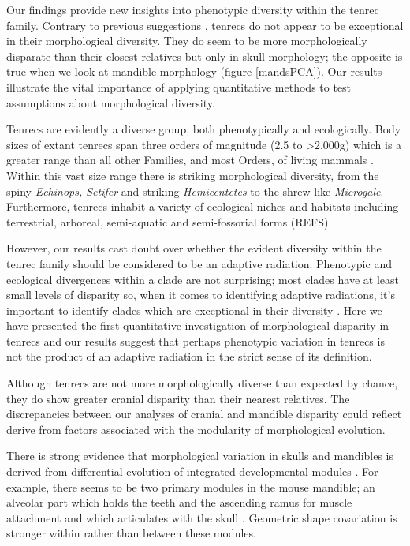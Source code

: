 \documentclass[12pt,a4paper]{article}
\begin{document}
Our findings provide new insights into phenotypic diversity within the tenrec family. Contrary to previous suggestions \citep[e.g.][]{Eisenberg1969, Olson2013}, tenrecs do not appear to be exceptional in their morphological diversity. They do seem to be more morphologically disparate than their closest relatives but only in skull morphology; the opposite is true when we look at mandible morphology (figure \ref{mandsPCA}). Our results illustrate the vital importance of applying quantitative methods to test assumptions about morphological diversity. 


Tenrecs are evidently a diverse group, both phenotypically and ecologically. Body sizes of extant tenrecs span three orders of magnitude (2.5 to \textgreater 2,000g) which is a greater range than all other Families, and most Orders, of living mammals \citep{Olson2003}. Within this vast size range there is striking morphological diversity, from the spiny \textit{Echinops, Setifer} and striking \textit{Hemicentetes} to the shrew-like  \textit{Microgale}. Furthermore, tenrecs inhabit a variety of ecological niches and habitats including terrestrial, arboreal, semi-aquatic and semi-fossorial forms (REFS).

However, our results cast doubt over whether the evident diversity within the tenrec family should be considered to be an adaptive radiation. Phenotypic and ecological divergences within a clade are not surprising; most clades have at least small levels of disparity so, when it comes to identifying adaptive radiations, it's important to identify clades which are exceptional in their diversity \citep{Losos2010a}. Here we have presented the first quantitative investigation of morphological disparity in tenrecs and our results suggest that perhaps phenotypic variation in tenrecs is not the product of an adaptive radiation in the strict sense of its definition.

Although tenrecs are not more morphologically diverse than expected by chance, they do show greater cranial disparity than their nearest relatives. The discrepancies between our analyses of cranial and mandible disparity could reflect derive from factors associated with the modularity of morphological evolution.

There is strong evidence that morphological variation in skulls and mandibles is derived from differential evolution of integrated developmental modules \citep[reviewed by][]{Klingenberg2013a}.
For example, there seems to be two primary modules in the mouse mandible; an alveolar part which holds the teeth and the ascending ramus for muscle attachment and which articulates with the skull \citep{Klingenberg2008a}. Geometric shape covariation is stronger within rather than between these modules. 
\end{document}
